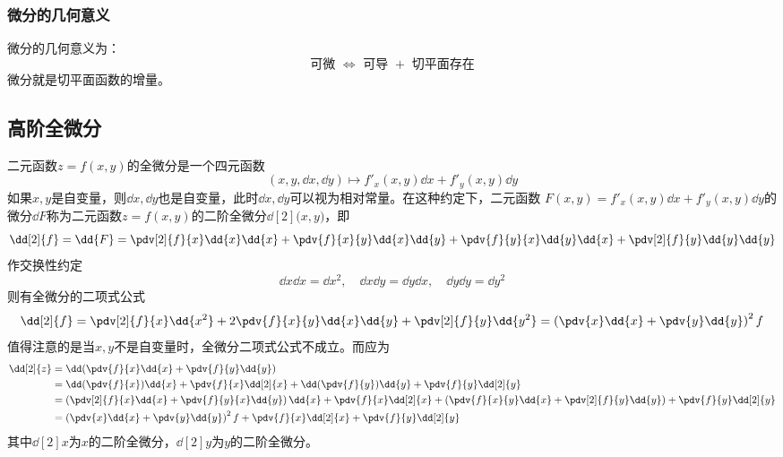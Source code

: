 \subsubsection{微分的几何意义}
微分的几何意义为：
\[ \text{可微~} \iff \text{ 可导~}+\text{ 切平面存在} \]
微分就是切平面函数的增量。

\subsection{高阶全微分}
二元函数$z=f(x,y)$的全微分是一个四元函数
\[ (x,y,\dd{x},\dd{y})\mapsto f'_x(x,y)\dd{x} + f'_y(x,y)\dd{y} \]
如果$x,y$是自变量，则$\dd{x},\dd{y}$也是自变量，此时$\dd{x},\dd{y}$可以视为相对常量。在这种约定下，二元函数
$F(x,y)=f'_x(x,y)\dd{x}+ f'_y(x,y)\dd{y}$的微分$\dd{F}$称为二元函数$z=f(x,y)$的二阶全微分$\dd[2]{(}x,y)$，即
\begin{equation}
    \dd[2]{f}
    = \dd{F}
    = \pdv[2]{f}{x}\dd{x}\dd{x}
    + \pdv{f}{x}{y}\dd{x}\dd{y}
    + \pdv{f}{y}{x}\dd{y}\dd{x}
    + \pdv[2]{f}{y}\dd{y}\dd{y}
\end{equation}
作交换性约定
\[
    \dd{x}\dd{x} = \dd{x^2},\quad \dd{x}\dd{y}= \dd{y}\dd{x},\quad \dd{y}\dd{y}=\dd{y^2}
\]
则有全微分的二项式公式
\begin{equation}
    \dd[2]{f}
    = \pdv[2]{f}{x}\dd{x^2}
    + 2\pdv{f}{x}{y}\dd{x}\dd{y}
    + \pdv[2]{f}{y}\dd{y^2}
    = \left(\pdv{x}\dd{x} + \pdv{y}\dd{y}\right)^2 f
\end{equation}
值得注意的是当$x,y$不是自变量时，全微分二项式公式不成立。而应为
\begin{equation}
    \begin{split}
        \dd[2]{z}
        &= \dd(\pdv{f}{x}\dd{x} + \pdv{f}{y}\dd{y})                    \\
        &= \dd(\pdv{f}{x})\dd{x}
        + \pdv{f}{x}\dd[2]{x}
        + \dd(\pdv{f}{y})\dd{y}
        + \pdv{f}{y}\dd[2]{y}                                                                                 \\
        &= \left(\pdv[2]{f}{x}\dd{x} + \pdv{f}{y}{x}\dd{y}\right)\dd{x}
        + \pdv{f}{x}\dd[2]{x}
        + \left(\pdv{f}{x}{y}\dd{x} + \pdv[2]{f}{y}\dd{y}\right)
        + \pdv{f}{y}\dd[2]{y}                                                                                 \\
        &= \left(\pdv{x}\dd{x} + \pdv{y}\dd{y}\right)^2 f
        + \pdv{f}{x}\dd[2]{x}
        + \pdv{f}{y}\dd[2]{y}
    \end{split}
\end{equation}
其中$\dd[2]{x}$为$x$的二阶全微分，$\dd[2]{y}$为$y$的二阶全微分。


